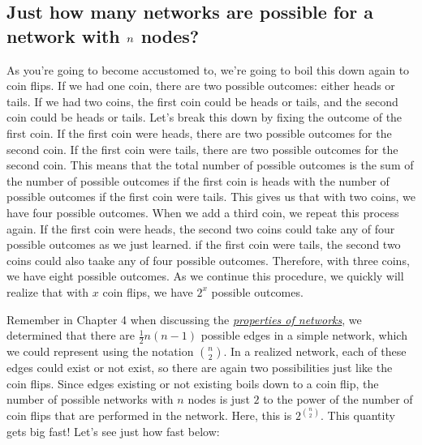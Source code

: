 \documentclass[letterpaper,10pt,english]{jupyterBook}
\begin{document}
\subsection{Just how many networks are possible for a network with \protect\(n\protect\) nodes?}
\label{\detokenize{representations/ch5/single-network-models_ER:just-how-many-networks-are-possible-for-a-network-with-n-nodes}}
\sphinxAtStartPar
As you’re going to become accustomed to, we’re going to boil this down again to coin flips. If we had one coin, there are two possible outcomes: either heads or tails. If we had two coins, the first coin could be heads or tails, and the second coin could be heads or tails. Let’s break this down by fixing the outcome of the first coin. If the first coin were heads, there are two possible outcomes for the second coin. If the first coin were tails, there are two possible outcomes for the second coin. This means that the total number of possible outcomes is the sum of the number of possible outcomes if the first coin is heads with the number of possible outcomes if the first coin were tails. This gives us that with two coins, we have four possible outcomes. When we add a third coin, we repeat this process again. If the first coin were heads, the second two coins could take any of four possible outcomes as we just learned. if the first coin were tails, the second two coins could also taake any of four possible outcomes. Therefore, with three coins, we have eight possible outcomes. As we continue this procedure, we quickly will realize that with \(x\) coin flips, we have \(2^x\) possible outcomes.

\sphinxAtStartPar
Remember in Chapter 4 when discussing the {\hyperref[\detokenize{representations/ch5/single-network-models_ER:link?}]{\emph{properties of networks}}}, we determined that there are \(\frac{1}{2}n(n - 1)\) possible edges in a simple network, which we could represent using the notation \(\binom n 2\). In a realized network, each of these edges could exist or not exist, so there are again two possibilities just like the coin flips. Since edges existing or not existing boils down to a coin flip, the number of possible networks with \(n\) nodes is just \(2\) to the power of the number of coin flips that are performed in the network. Here, this is \(2^{\binom n 2}\). This quantity gets  big  fast! Let’s see just how fast below:

\begin{sphinxVerbatim}[commandchars=\\\{\}]
   
   

   
  \PYG{p}{[}     \PYG{p}{]}
\end{sphinxVerbatim}
\end{document}
